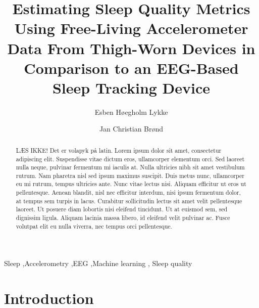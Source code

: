 \documentclass[
  super,
  preprint,
  3p]{elsarticle}
\begin{document}
\begin{frontmatter}
\title{Estimating Sleep Quality Metrics Using Free-Living Accelerometer
Data From Thigh-Worn Devices in Comparison to an EEG-Based Sleep
Tracking Device}
\author[1]{Esben Høegholm Lykke%
%
}
\author[1]{Jan Christian Brønd%
%
}




        
\begin{abstract}
LÆS IKKE! Det er volapyk på latin. Lorem ipsum dolor sit amet,
consectetur adipiscing elit. Suspendisse vitae dictum eros, ullamcorper
elementum orci. Sed laoreet nulla neque, pulvinar fermentum mi iaculis
at. Nulla ultricies nibh sit amet vestibulum rutrum. Nam pharetra nisl
sed ipsum maximus suscipit. Duis metus nunc, ullamcorper eu mi rutrum,
tempus ultricies ante. Nunc vitae lectus nisi. Aliquam efficitur ut eros
ut pellentesque. Aenean blandit, nisl nec efficitur interdum, nisi ipsum
fermentum dolor, at tempus sem turpis in lacus. Curabitur sollicitudin
lectus sit amet velit pellentesque laoreet. Ut posuere diam lobortis
nisi eleifend tincidunt. Ut at euismod sem, sed dignissim ligula.
Aliquam lacinia massa libero, id eleifend velit pulvinar ac. Fusce
volutpat elit eu nulla viverra, nec tempus orci pellentesque.
\end{abstract}





\begin{keyword}
    Sleep \sep Accelerometry \sep EEG \sep Machine learning \sep 
    Sleep quality
\end{keyword}
\end{frontmatter}
    \ifdefined\Shaded\renewenvironment{Shaded}{\begin{tcolorbox}[sharp corners, interior hidden, frame hidden, enhanced, boxrule=0pt, borderline west={3pt}{0pt}{shadecolor}, breakable]}{\end{tcolorbox}}\fi

\hypertarget{introduction}{%
\section{Introduction}\label{introduction}}
\end{document}
